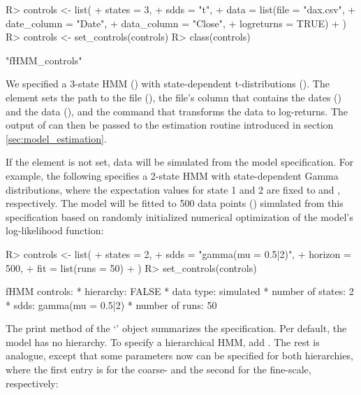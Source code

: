 \documentclass[article]{jss}
\newcommand{\class}[1]{`\code{#1}'}
\newcommand{\fct}[1]{\code{#1()}}
\begin{document}

%
\begin{Schunk}
\begin{Sinput}
R> controls <- list(
+    states = 3,
+    sdds   = "t",
+    data   = list(file        = "dax.csv",
+                  date_column = "Date",
+                  data_column = "Close",
+                  logreturns  = TRUE)
+  )
R> controls <- set_controls(controls)
R> class(controls)
\end{Sinput}
\begin{Soutput}
[1] "fHMM_controls"
\end{Soutput}
\end{Schunk}
%

We specified a 3-state HMM () with state-dependent t-distributions (). The  element sets the path to the file (), the file's column that contains the dates () and the data (), and the command  that transforms the data to log-returns. The output of \fct{set\_controls} can then be passed to the estimation routine introduced in section \ref{sec:model_estimation}.

If the  element is not set, data will be simulated from the model specification. For example, the following specifies a 2-state HMM with state-dependent Gamma distributions, where the expectation values for state 1 and 2 are fixed to  and , respectively. The model will be fitted to 500 data points () simulated from this specification based on  randomly initialized numerical optimization of the model's log-likelihood function:

%
\begin{Schunk}
\begin{Sinput}
R> controls <- list(
+    states  = 2,
+    sdds    = "gamma(mu = 0.5|2)",
+    horizon = 500,
+    fit     = list(runs = 50)
+  )
R> set_controls(controls)
\end{Sinput}
\begin{Soutput}
fHMM controls:
* hierarchy: FALSE 
* data type: simulated 
* number of states: 2 
* sdds: gamma(mu = 0.5|2) 
* number of runs: 50  
\end{Soutput}
\end{Schunk}
%

The print method of the \class{fHMM\_controls} object summarizes the specification. Per default, the model has no hierarchy. To specify a hierarchical HMM, add . The rest is analogue, except that some parameters now can be specified for both hierarchies, where the first entry is for the coarse- and the second for the fine-scale, respectively:
\end{document}
